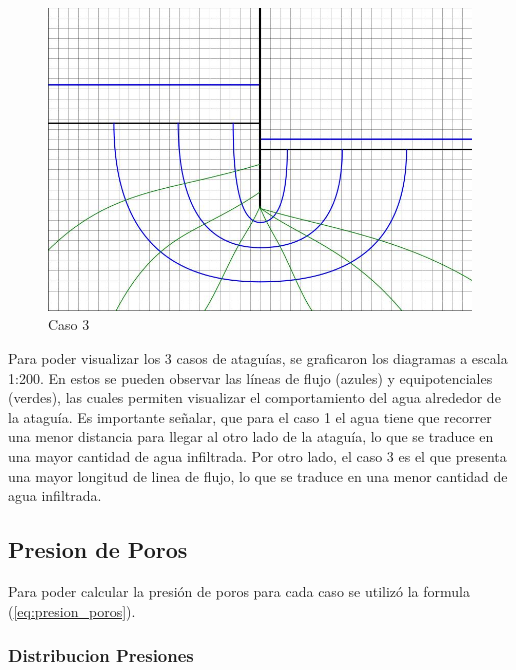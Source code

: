 \begin{figure}[H]
\begin{minipage}{0.32\textwidth}
        \includegraphics[width=\textwidth]{GRAFICOS/caso_3.jpg}
        \caption{Caso 3}
        \label{fig:caso_3}
    \end{minipage}
  \end{figure}

Para poder visualizar los 3 casos de ataguías, se graficaron los diagramas a escala 1:200. En estos se pueden observar las líneas de flujo (azules) y equipotenciales (verdes), las cuales permiten visualizar el comportamiento del agua alrededor de la ataguía. Es importante señalar, que para el caso 1 el agua tiene que recorrer una menor distancia para llegar al otro lado de la ataguía, lo que se traduce en una mayor cantidad de agua infiltrada. Por otro lado, el caso 3 es el que presenta una mayor longitud de linea de flujo, lo que se traduce en una menor cantidad de agua infiltrada.

\subsection{Presion de Poros}
Para poder calcular la presión de poros para cada caso se utilizó la formula (\ref{eq:presion_poros}). 
\subsubsection{Distribucion Presiones}

